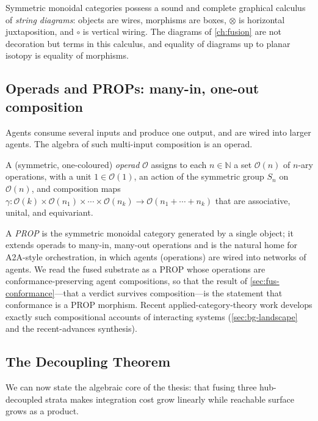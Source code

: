 Symmetric monoidal categories possess a sound and complete graphical calculus of
\emph{string diagrams}: objects are wires, morphisms are boxes, $\otimes$ is
horizontal juxtaposition, and $\circ$ is vertical wiring. The diagrams of
\cref{ch:fusion} are not decoration but terms in this calculus, and equality of
diagrams up to planar isotopy is equality of morphisms.

\subsection{Operads and PROPs: many-in, one-out composition}
\label{sec:alg-operad}

Agents consume several inputs and produce one output, and are wired into larger
agents. The algebra of such multi-input composition is an operad.

\begin{definition}[Operad]
A (symmetric, one-coloured) \emph{operad} $\mathcal O$ assigns to each
$n\in\mathbb N$ a set $\mathcal O(n)$ of $n$-ary operations, with a unit
$1\in\mathcal O(1)$, an action of the symmetric group $S_n$ on $\mathcal O(n)$,
and composition maps
$\gamma\colon\mathcal O(k)\times\mathcal O(n_1)\times\cdots\times\mathcal
O(n_k)\to\mathcal O(n_1+\cdots+n_k)$
that are associative, unital, and equivariant.
\end{definition}

\begin{remark}
A \emph{PROP} is the symmetric monoidal category generated by a single object; it
extends operads to many-in, many-out operations and is the natural home for
A2A-style orchestration, in which agents (operations) are wired into networks of
agents. We read the fused substrate as a PROP whose operations are
conformance-preserving agent compositions, so that the result of
\cref{sec:fus-conformance}---that a verdict survives composition---is the
statement that conformance is a PROP morphism. Recent applied-category-theory work
develops exactly such compositional accounts of interacting systems
(\cref{sec:bg-landscape} and the recent-advances synthesis).
\end{remark}

\subsection{The Decoupling Theorem}
\label{sec:alg-theorem}

We can now state the algebraic core of the thesis: that fusing three hub-decoupled
strata makes integration cost grow linearly while reachable surface grows as a
product.

